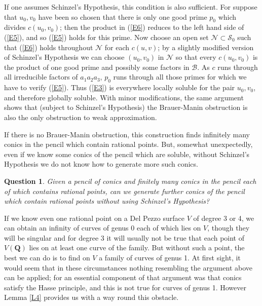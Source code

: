 \documentclass[12pt]{article}
\def\bQ{{\mathbf Q}}
\def\sB{{\mathcal B}}
\def\sN{{\mathcal N}}
\def\sS{{\mathcal S}}
\def\bpr{\begin{question} \label}
\def\epr{\end{question}}
\newtheorem{question}{Question}
\begin{document}
If one assumes Schinzel's Hypothesis, this condition is also
sufficient. For suppose that $u_0,v_0$ have been so chosen that there is only
one good prime $p_0$ which divides $c(u_0,v_0)$; then the product in (\ref{E6})
reduces to the left hand side of (\ref{E5}), and so (\ref{E5}) holds for this
prime. Now choose an open set $\sN\subset\sS_0$ such that (\ref{E6}) holds
throughout $\sN$ for each $c(u,v)$; by a slightly modified version
of Schinzel's Hypothesis we can choose $(u_0,v_0)$ in $\sN$
so that every $c(u_0,v_0)$ is
the product of one good prime and possibly some factors in $\sB$. As $c$ runs
through all irreducible factors of $a_1a_2a_3$, $p_0$ runs through all those
primes for which we have to verify (\ref{E5}). Thus (\ref{E3}) is everywhere
locally soluble for the pair $u_0,v_0$, and therefore globally soluble. With
minor modifications, the same argument shows that (subject to Schinzel's
Hypothesis) the Brauer-Manin obstruction is also the only obstruction to weak
approximation.

If there is no Brauer-Manin obstruction, this construction finds infinitely
many conics in the pencil which
contain rational points. But, somewhat unexpectedly, even if we know some
conics of the pencil which are soluble, without Schinzel's Hypothesis we do
not know how to generate more such conics.
\bpr{Q11} Given a pencil of conics and finitely many conics in the pencil each
of which contains rational points, can we generate further conics of the
pencil which contain rational points without using Schinzel's Hypothesis?
\epr

\medskip

If we know even one rational point on a Del Pezzo surface $V$ of degree 3 or 4,
we can obtain an infinity of curves of genus 0 each of which lies on $V$,
though they will be singular and for degree 3
it will usually not be true that each point of $V(\bQ)$ lies on at least
one curve of the family. But without
such a point, the best we can do is to find on $V$ a family of curves of
genus 1. At first sight, it would seem that in these circumstances nothing
resembling the argument above can be applied;
for an essential component of that
argument was that conics satisfy the Hasse principle, and this is not true
for curves of genus 1. However Lemma \ref{L4} provides us with a way round
this obstacle.
\end{document}
